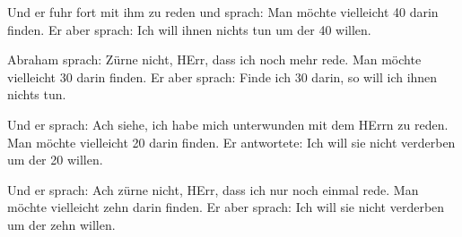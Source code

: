  Und er fuhr fort mit ihm zu reden und sprach: Man möchte
vielleicht 40 darin finden. Er aber sprach: Ich will ihnen nichts tun um
der 40 willen.

 Abraham sprach: Zürne nicht, HErr, dass ich noch mehr
rede. Man möchte vielleicht 30 darin finden. Er aber sprach: Finde ich
30 darin, so will ich ihnen nichts tun.

 Und er sprach: Ach siehe, ich habe mich unterwunden mit
dem HErrn zu reden. Man möchte vielleicht 20 darin finden. Er
antwortete: Ich will sie nicht verderben um der 20 willen.

 Und er sprach: Ach zürne nicht, HErr, dass ich nur noch
einmal rede. Man möchte vielleicht zehn darin finden. Er aber sprach:
Ich will sie nicht verderben um der zehn willen.

